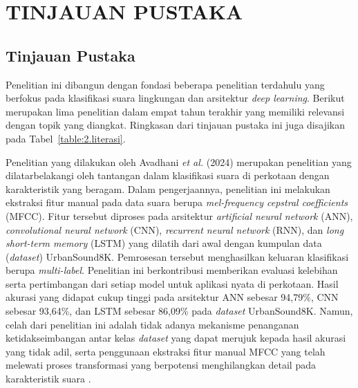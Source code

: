 \newpage
\chapter{TINJAUAN PUSTAKA} \label{Bab II}

\section{Tinjauan Pustaka} \label{II.Tinjauan}
Penelitian ini dibangun dengan fondasi beberapa penelitian terdahulu yang berfokus pada klasifikasi suara lingkungan dan arsitektur \textit{deep learning}.
Berikut merupakan lima penelitian dalam empat tahun terakhir yang memiliki relevansi dengan topik yang diangkat. 
Ringkasan dari tinjauan pustaka ini juga disajikan pada Tabel~\ref{table:2.literasi}. \par

Penelitian yang dilakukan oleh Avadhani \textit{et al.} (2024) merupakan penelitian yang dilatarbelakangi oleh tantangan dalam klasifikasi suara di perkotaan dengan karakteristik yang beragam.
Dalam pengerjaannya, penelitian ini melakukan ekstraksi fitur manual pada data suara berupa \textit{mel-frequency cepstral coefficients} (MFCC).
Fitur tersebut diproses pada arsitektur \textit{artificial neural network} (ANN), \textit{convolutional neural network} (CNN), \textit{recurrent neural network} (RNN), dan \textit{long short-term memory} (LSTM) yang dilatih dari awal dengan kumpulan data (\textit{dataset}) UrbanSound8K.
Pemrosesan tersebut menghasilkan keluaran klasifikasi berupa \textit{multi-label}.
Penelitian ini berkontribusi memberikan evaluasi kelebihan serta pertimbangan dari setiap model untuk aplikasi nyata di perkotaan.
Hasil akurasi yang didapat cukup tinggi pada arsitektur ANN sebesar 94,79\%, CNN sebesar 93,64\%, dan LSTM sebesar 86,09\% pada \textit{dataset} UrbanSound8K. 
Namun, celah dari penelitian ini adalah tidak adanya mekanisme penanganan ketidakseimbangan antar kelas \textit{dataset} yang dapat merujuk kepada hasil akurasi yang tidak adil, serta penggunaan ekstraksi fitur manual MFCC yang telah melewati proses transformasi yang berpotensi menghilangkan detail pada karakteristik suara \cite{avadhani2024multi}. \par

